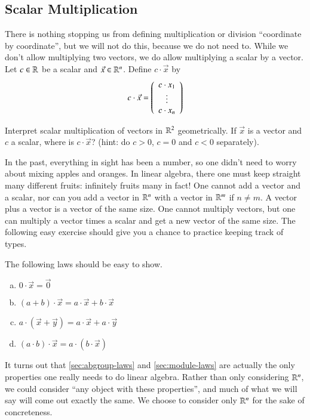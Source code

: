 \documentclass[Main.tex]{subfiles}
\begin{document}
\subsection{Scalar Multiplication}
There is nothing stopping us from defining multiplication or division ``coordinate by coordinate'', but we will not do this, because we do not need to.  
While we don't allow multiplying two vectors, we do allow multiplying a scalar by a vector.  
Let $c\in \mathbb{R}$ be a scalar and $\vec{x}\in\mathbb{R}^n$.  
Define $c\cdot \vec{x}$ by
\[c\cdot\vec{x}=\left(\begin{array}{c}c\cdot x_1 \\ \vdots \\ c\cdot x_n\end{array}\right)\]
\begin{ImpEasyEx}
  Interpret scalar multiplication of vectors in $\mathbb{R}^2$ geometrically.  
  If $\vec{x}$ is a vector and $c$ a scalar, where is $c\cdot\vec{x}$?
  (hint: do $c>0$, $c=0$ and $c<0$ separately).  
\end{ImpEasyEx}
\begin{ImportantRemark}
  In the past, everything in sight has been a number, so one didn't need to worry about mixing apples and oranges.
  In linear algebra, there one must keep straight many different fruits: infinitely fruits many in fact!
  One cannot add a vector and a scalar, nor can you add a vector in $\mathbb{R}^n$ with a vector in $\mathbb{R}^m$ if $n\ne m$.  
  A vector plus a vector is a vector of the same size.  
  One cannot multiply vectors, but one can multiply a vector times a scalar and get a new vector of the same size.
  The following easy exercise should give you a chance to practice keeping track of types.  
\end{ImportantRemark}
\begin{ImpEasyEx}
  \label{sec:module-laws}
  The following laws should be easy to show.
  \begin{enumerate}[a)]
  \item $0\cdot\vec{x} = \vec{0}$
  \item $(a+b)\cdot\vec{x} = a\cdot\vec{x} + b\cdot\vec{x}$
  \item $a\cdot (\vec{x} + \vec{y}) = a\cdot\vec{x} + a\cdot\vec{y}$
  \item $(a\cdot b)\cdot\vec{x} = a\cdot (b\cdot\vec{x})$
  \end{enumerate}
\end{ImpEasyEx}

\begin{RemarkExp}
  It turns out that \ref{sec:abgroup-laws} and \ref{sec:module-laws} are actually the only properties one really needs to do linear algebra.
  Rather than only considering $\mathbb{R}^n$, we could consider ``any object with these properties'', and much of what we will say will come out exactly the same.
  We choose to consider only $\mathbb{R}^n$ for the sake of concreteness.  
\end{RemarkExp}
\end{document}
